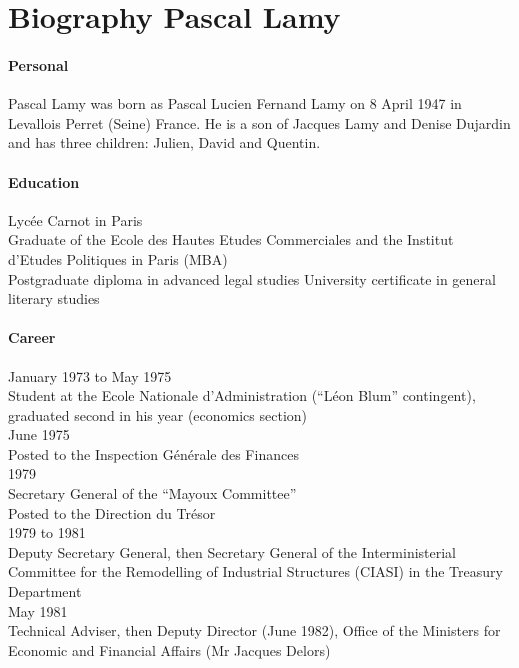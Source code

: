 \chapter{Biography Pascal Lamy}

\subsubsection{Personal}
Pascal Lamy was born as  Pascal Lucien Fernand Lamy  on 8 April 1947 in Levallois Perret (Seine) France.
He is a son of Jacques Lamy and Denise Dujardin and has 
three children: Julien, David and Quentin.\\


\subsubsection{Education}
Lycée Carnot in Paris\\
    Graduate of the Ecole des Hautes Etudes Commerciales and
    the Institut d'Etudes Politiques in Paris (MBA)\\
    Postgraduate diploma in advanced legal studies
    University certificate in general literary studies
    
\subsubsection{Career}

\indent January 1973 to May 1975\\
Student at the Ecole Nationale d'Administration (“Léon Blum” contingent), graduated second in his year (economics section)\\

June 1975    \\
Posted to the Inspection Générale des Finances\\

1979\\
Secretary General of the “Mayoux Committee”\\
 Posted to the Direction du Trésor\\
 
1979 to 1981\\
Deputy Secretary General, then Secretary General of the Interministerial Committee for the Remodelling of Industrial Structures (CIASI) in the Treasury Department\\   

May 1981\\
 Technical Adviser, then Deputy Director (June 1982), Office of the Ministers for Economic and Financial Affairs (Mr Jacques Delors)\\  
 
